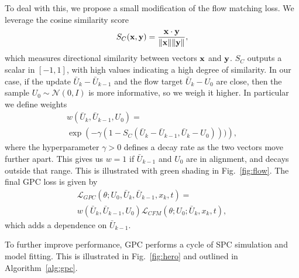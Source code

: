 \documentclass[letterpaper, 10 pt]{ieeeconf}
\begin{document}
To deal with this, we propose a small modification of the flow matching loss. We leverage the cosine similarity score
\begin{equation}
 S_C(\mathbf{x}, \mathbf{y}) = \frac{\mathbf{x} \cdot \mathbf{y}}{\|\mathbf{x}\|\|\mathbf{y}\|},
\end{equation}
which measures directional similarity between vectors $\mathbf{x}$ and $\mathbf{y}$. $S_C$ outputs a scalar in $[-1, 1]$, with high values indicating a high degree of similarity. In our case, if the update $\bar{U}_k - \bar{U}_{k-1}$ and the flow target $\bar{U}_k - U_0$ are close, then the sample $U_0 \sim \mathcal{N}(0, I)$ is more informative, so we weigh it higher. In particular we define weights
\begin{multline}\label{eq:weights}
 w(\bar{U}_k, \bar{U}_{k-1}, U_0) = \\
 \exp\left(-\gamma (1 - S_C(\bar{U}_k - \bar{U}_{k-1}, \bar{U}_k - U_0)))\right),
\end{multline}
where the hyperparameter $\gamma > 0$ defines a decay rate as the two vectors move further apart. This gives us $w = 1$ if $\bar{U}_{k-1}$ and $U_0$ are in alignment, and decays outside that range. This is illustrated with green shading in Fig.~\ref{fig:flow}. The final GPC loss is given by
\begin{multline}
 \mathcal{L}_{GPC}(\theta; U_0, \bar{U}_k, \bar{U}_{k-1}, x_k, t) = \\
 w(\bar{U}_k, \bar{U}_{k-1}, U_0) \mathcal{L}_{CFM}(\theta; U_0; \bar{U}_k, x_k, t),
\end{multline}
which adds a dependence on $\bar{U}_{k-1}$.

To further improve performance, GPC performs a cycle of SPC simulation and model fitting. This is illustrated in Fig.~\ref{fig:hero} and outlined in Algorithm~\ref{alg:gpc}. 
\end{document}
